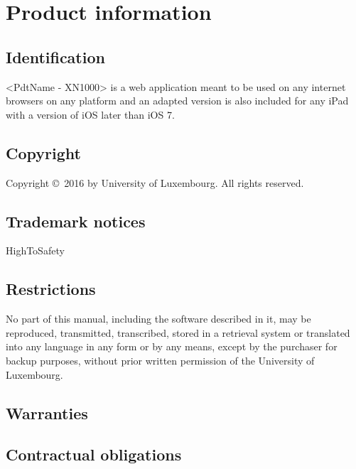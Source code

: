 \chapter{Product information}
\vspace{-6em}


\section{Identification}
<\gls{PdtName} - XN1000> is a web application meant to be used on any internet
browsers on any platform and an adapted version is also included for any iPad
with a version of iOS later than iOS 7.

\section{Copyright}
Copyright \copyright \ 2016 by University of Luxembourg. All rights reserved.

\section{Trademark notices}
HighToSafety \circledR

\section{Restrictions}
No part of this manual, including the software described in it, may be
reproduced, transmitted, transcribed, stored in a retrieval system or translated
into any language in any form or by any means, except by the purchaser for
backup purposes, without prior written permission of the University of
Luxembourg.

\section{Warranties}

\section{Contractual obligations}

